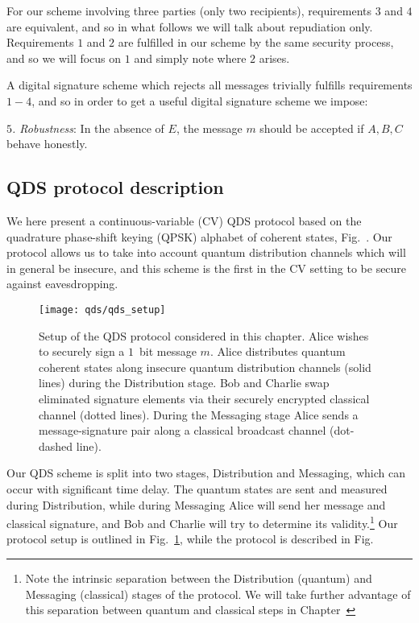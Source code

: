 For our scheme involving three parties (only two recipients), requirements $3$ and $4$ are equivalent, and so in what follows we will talk about repudiation only. Requirements $1$ and $2$ are fulfilled in our scheme by the same security process, and so we will focus on $1$ and simply note where $2$ arises.


A digital signature scheme which rejects all messages trivially fulfills requirements $1-4$, and so in order to get a useful digital signature scheme we impose:

\noindent \emph{$5$. Robustness}: In the absence of $E$, the message $m$ should be accepted if $A, B, C$ behave honestly.

\subsection{QDS protocol description}

We here present a continuous-variable (CV) QDS protocol based on the quadrature phase-shift keying (QPSK) alphabet of coherent states, Fig.~. %
Our protocol allows us to take into account quantum distribution channels which will in general be insecure, and this scheme is the first in the CV setting to be secure against eavesdropping. 

\begin{figure}[htp]
\centering
\texttt{[image: qds/qds\_setup]}
\caption{\label{fig:qds_setup}  Setup of the QDS protocol considered in this chapter. Alice wishes to securely sign a $1$~bit message $m$. Alice distributes quantum coherent states along insecure quantum distribution channels (solid lines) during the Distribution stage. Bob and Charlie swap eliminated signature elements via their securely encrypted classical channel (dotted lines). During the Messaging stage Alice sends a message-signature pair along a classical broadcast channel (dot-dashed line).}
\end{figure}


Our QDS scheme is split into two stages, Distribution and Messaging, which can occur with significant time delay. The quantum states are sent and measured during Distribution, while during Messaging Alice will send her message and classical signature, and Bob and Charlie will try to determine its validity.\footnote{Note the intrinsic separation between the Distribution (quantum) and Messaging (classical) stages of the protocol. We will take further advantage of this separation between quantum and classical steps in Chapter~} Our protocol setup is outlined in Fig.~\ref{fig:qds_setup}, while the protocol is described in Fig.~ 



